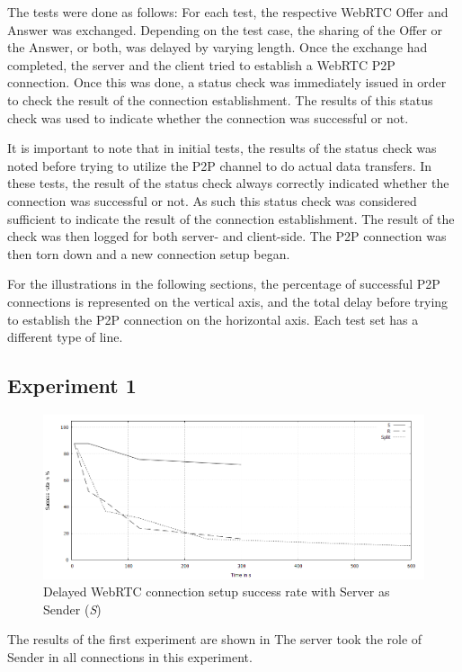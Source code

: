 The tests were done as follows:
For each test, the respective WebRTC Offer and Answer was exchanged. Depending on the test case, the sharing of the Offer or the Answer, or both, was delayed by varying length. Once the exchange had completed, the server and the client tried to establish a WebRTC P2P connection. Once this was done, a status check was immediately issued in order to check the result of the connection establishment. The results of this status check was used to indicate whether the connection was successful or not.

It is important to note that in initial tests, the results of the status check was noted before trying to utilize the P2P channel to do actual data transfers. In these tests, the result of the status check always correctly indicated whether the connection was successful or not. As such this status check was considered sufficient to indicate the result of the connection establishment. The result of the check was then logged for both server- and client-side. The P2P connection was then torn down and a new connection setup began.
%

For the illustrations in the following sections, the percentage of successful P2P connections is represented on the vertical axis, and the total delay before trying to establish the P2P connection on the horizontal axis. Each test set has a different type of line. 
%
%
\subsection{Experiment 1}
%
\begin{figure}[th]
  \centering
  \includegraphics[width=\textwidth]{Figures/Exp1_res}
  \decoRule
  \caption[Results Experiment 1]{Delayed WebRTC connection setup success rate with Server as Sender (\textit{S})}
  \label{fig:exp1}
\end{figure}
%
The results of the first experiment are shown in  The server took the role of Sender in all connections in this experiment.

